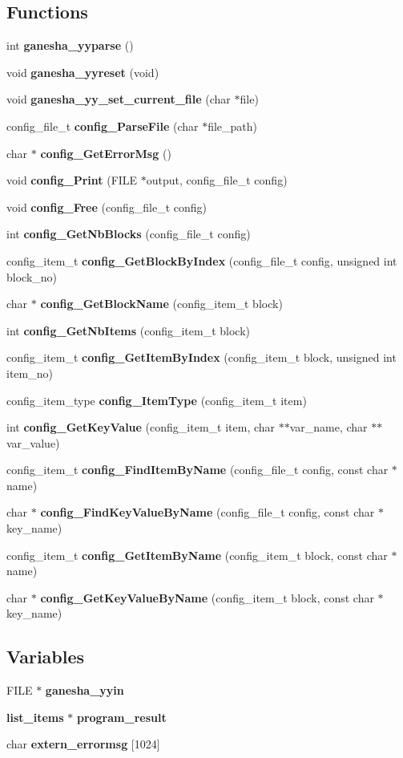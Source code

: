 \subsection*{Functions}
\begin{CompactItemize}
\item 
int {\bf ganesha\_\-yyparse} ()
\item 
void {\bf ganesha\_\-yyreset} (void)
\item 
void {\bf ganesha\_\-yy\_\-set\_\-current\_\-file} (char $\ast$file)
\item 
config\_\-file\_\-t {\bf config\_\-ParseFile} (char $\ast$file\_\-path)
\item 
char $\ast$ {\bf config\_\-GetErrorMsg} ()
\item 
void {\bf config\_\-Print} (FILE $\ast$output, config\_\-file\_\-t config)
\item 
void {\bf config\_\-Free} (config\_\-file\_\-t config)
\item 
int {\bf config\_\-GetNbBlocks} (config\_\-file\_\-t config)
\item 
config\_\-item\_\-t {\bf config\_\-GetBlockByIndex} (config\_\-file\_\-t config, unsigned int block\_\-no)
\item 
char $\ast$ {\bf config\_\-GetBlockName} (config\_\-item\_\-t block)
\item 
int {\bf config\_\-GetNbItems} (config\_\-item\_\-t block)
\item 
config\_\-item\_\-t {\bf config\_\-GetItemByIndex} (config\_\-item\_\-t block, unsigned int item\_\-no)
\item 
config\_\-item\_\-type {\bf config\_\-ItemType} (config\_\-item\_\-t item)
\item 
int {\bf config\_\-GetKeyValue} (config\_\-item\_\-t item, char $\ast$$\ast$var\_\-name, char $\ast$$\ast$var\_\-value)
\item 
config\_\-item\_\-t {\bf config\_\-FindItemByName} (config\_\-file\_\-t config, const char $\ast$name)
\item 
char $\ast$ {\bf config\_\-FindKeyValueByName} (config\_\-file\_\-t config, const char $\ast$key\_\-name)
\item 
config\_\-item\_\-t {\bf config\_\-GetItemByName} (config\_\-item\_\-t block, const char $\ast$name)
\item 
char $\ast$ {\bf config\_\-GetKeyValueByName} (config\_\-item\_\-t block, const char $\ast$key\_\-name)
\end{CompactItemize}
\subsection*{Variables}
\begin{CompactItemize}
\item 
FILE $\ast$ {\bf ganesha\_\-yyin}
\item 
{\bf list\_\-items} $\ast$ {\bf program\_\-result}
\item 
char {\bf extern\_\-errormsg} [1024]
\end{CompactItemize}


